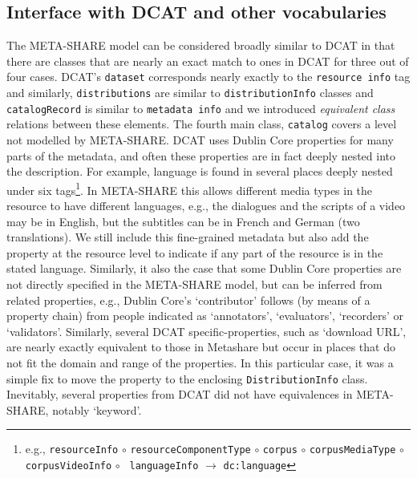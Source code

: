 \documentclass{llncs}
\begin{document}
{\subsection{Interface with DCAT and other vocabularies}
\label{sec:dcat}
The META-SHARE model can be considered broadly similar to DCAT in that there are
classes that are nearly an exact match to ones in DCAT for three out of four
cases. DCAT's {\tt dataset} corresponds nearly exactly to the {\tt resource
info} tag and similarly, {\tt distributions} are similar to {\tt distributionInfo} 
classes and {\tt catalogRecord} is similar to {\tt metadata info} and we
introduced \emph{equivalent class} relations between these elements. The
fourth main class, {\tt catalog} covers a level not modelled by META-SHARE.
DCAT uses Dublin Core properties for many parts of the metadata, and often these
properties are in fact deeply nested into the description. For example, language
is found in several places deeply nested under six
tags\footnote{e.g., {\tt resourceInfo} $\circ$ {\tt resourceComponentType}
    $\circ$ {\tt corpus} $\circ$ {\tt corpusMediaType} $\circ$ {\tt corpusVideoInfo}
    $\circ$ {\tt
languageInfo} $\rightarrow$ {\tt dc:language}}. In META-SHARE this allows different media types in the resource
to have different languages, e.g., the dialogues and the scripts of a video may
be in English, but the subtitles can be in French and German (two translations).
We still include this fine-grained metadata but also add the property at the resource level
to indicate if any part of the resource is in the stated language.
Similarly, it also the case that some Dublin Core properties are not directly
specified in the META-SHARE model, but can be inferred from related properties,
e.g., Dublin Core's `contributor' follows (by means of a property chain) from people indicated as `annotators',
`evaluators', `recorders' or `validators'. Similarly, several DCAT specific-properties, such as `download URL', are nearly
exactly equivalent to those in Metashare but occur in places that do not fit the
domain and range of the properties. In this particular case, it was a simple fix
to move the property to the enclosing {\tt DistributionInfo} class.
Inevitably, several properties from DCAT did not have equivalences in
META-SHARE, notably `keyword'.

}
\end{document}
